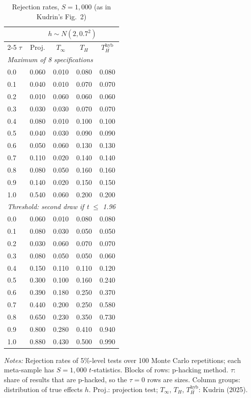 \begin{table}[htbp]
\centering
\caption{Rejection rates, $S = 1{,}000$ (as in Kudrin's Fig.~2)}
\label{tab:kudrin_style_var_dial_plus_gammahat_S1000}
\footnotesize
\setlength{\tabcolsep}{4pt}
\begin{tabular}{lcccc}
\toprule
 & \multicolumn{4}{c}{$h \sim N(2, 0.7^2)$} \\
\cmidrule(lr){2-5}
$\tau$ & Proj. & $T_\infty$ & $T_H$ & $T_H^{\mathrm{hyb}}$ \\
\midrule
\multicolumn{5}{l}{\textit{Maximum of 8 specifications}} \\
0.0 & 0.060 & 0.010 & 0.080 & 0.080 \\
0.1 & 0.040 & 0.010 & 0.070 & 0.070 \\
0.2 & 0.010 & 0.060 & 0.060 & 0.060 \\
0.3 & 0.030 & 0.030 & 0.070 & 0.070 \\
0.4 & 0.080 & 0.010 & 0.100 & 0.100 \\
0.5 & 0.040 & 0.030 & 0.090 & 0.090 \\
0.6 & 0.050 & 0.060 & 0.130 & 0.130 \\
0.7 & 0.110 & 0.020 & 0.140 & 0.140 \\
0.8 & 0.080 & 0.050 & 0.160 & 0.160 \\
0.9 & 0.140 & 0.020 & 0.150 & 0.150 \\
1.0 & 0.540 & 0.060 & 0.200 & 0.200 \\
\midrule
\multicolumn{5}{l}{\textit{Threshold: second draw if t $\le$ 1.96}} \\
0.0 & 0.060 & 0.010 & 0.080 & 0.080 \\
0.1 & 0.080 & 0.030 & 0.050 & 0.050 \\
0.2 & 0.030 & 0.060 & 0.070 & 0.070 \\
0.3 & 0.080 & 0.050 & 0.050 & 0.060 \\
0.4 & 0.150 & 0.110 & 0.110 & 0.120 \\
0.5 & 0.300 & 0.100 & 0.160 & 0.240 \\
0.6 & 0.390 & 0.180 & 0.250 & 0.370 \\
0.7 & 0.440 & 0.200 & 0.250 & 0.580 \\
0.8 & 0.650 & 0.230 & 0.350 & 0.730 \\
0.9 & 0.800 & 0.280 & 0.410 & 0.940 \\
1.0 & 0.880 & 0.430 & 0.500 & 0.990 \\
\bottomrule
\end{tabular}
\par\smallskip
\begin{minipage}{\linewidth}\footnotesize\textit{Notes:} Rejection rates of 5\%-level tests over 100 Monte Carlo repetitions; each meta-sample has $S = 1{,}000$ $t$-statistics. Blocks of rows: p-hacking method. $\tau$: share of results that are p-hacked, so the $\tau = 0$ rows are sizes. Column groups: distribution of true effects $h$. Proj.: projection test; $T_\infty$, $T_H$, $T_H^{\mathrm{hyb}}$: Kudrin (2025).\end{minipage}
\end{table}
